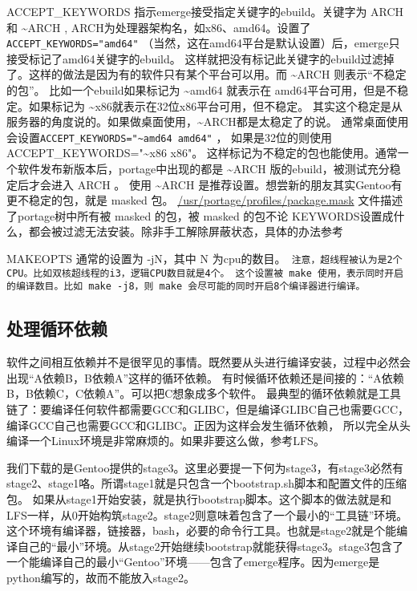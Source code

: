 \documentclass[amstex,twoside]{ctexbook}
\newenvironment{notice}{\tt}{}
\begin{document}
ACCEPT\_KEYWORDS%
指示emerge接受指定关键字的ebuild。关键字为 ARCH 和 \textasciitilde{}ARCH , ARCH为处理器架构名，如x86、amd64。设置了{\tt ACCEPT\_KEYWORDS="amd64"} （当然，这在amd64平台是默认设置）后，emerge只接受标记了amd64关键字的ebuild。
这样就把没有标记此关键字的ebuild过滤掉了。这样的做法是因为有的软件只有某个平台可以用。而 \textasciitilde{}ARCH 则表示“不稳定的包”。
比如一个ebuild如果标记为 \textasciitilde{}amd64 就表示在 amd64平台可用，但是不稳定。如果标记为 \textasciitilde{}x86就表示在32位x86平台可用，但不稳定。
其实这个稳定是从服务器的角度说的。如果做桌面使用，\textasciitilde{}ARCH都是太稳定了的说。
通常桌面使用会设置{\tt ACCEPT\_KEYWORDS="\textasciitilde{}amd64 amd64"} ， 如果是32位的则使用ACCEPT\_KEYWORDS="\textasciitilde{}x86 x86"。 这样标记为不稳定的包也能使用。通常一个软件发布新版本后，portage中出现的都是 \textasciitilde{}ARCH 版的ebuild，被测试充分稳定后才会进入 ARCH 。
使用 \textasciitilde{}ARCH 是推荐设置。想尝新的朋友其实Gentoo有更不稳定的包，就是 masked 包。
\url{/usr/portage/profiles/package.mask} 文件描述了portage树中所有被 masked 的包，被 masked 的包不论 KEYWORDS设置成什么，都会被过滤无法安装。除非手工解除屏蔽状态，具体的办法参考 %

MAKEOPTS%
通常的设置为 -jN，其中 N 为cpu的数目。\begin{notice}
注意，超线程被认为是2个CPU。比如双核超线程的i3，逻辑CPU数目就是4个。
\end{notice} 这个设置被 make 使用，表示同时开启的编译数目。比如 make -j8，则 make 会尽可能的同时开启8个编译器进行编译。


\subsection*{处理循环依赖}
软件之间相互依赖并不是很罕见的事情。既然要从头进行编译安装，过程中必然会出现“A依赖B，B依赖A”这样的循环依赖。
有时候循环依赖还是间接的：“A依赖B，B依赖C，C依赖A”。可以把C想象成多个软件。
最典型的循环依赖就是工具链了：要编译任何软件都需要GCC和GLIBC，但是编译GLIBC自己也需要GCC，编译GCC自己也需要GCC和GLIBC。正因为这样会发生循环依赖，
所以完全从头编译一个Linux环境是非常麻烦的。如果非要这么做，参考LFS。

我们下载的是Gentoo提供的stage3。这里必要提一下何为stage3，有stage3必然有stage2、stage1咯。所谓stage1就是只包含一个bootstrap.sh脚本和配置文件的压缩包。
如果从stage1开始安装，就是执行bootstrap脚本。这个脚本的做法就是和LFS一样，从0开始构筑stage2。stage2则意味着包含了一个最小的“工具链”环境。
这个环境有编译器，链接器，bash，必要的命令行工具。也就是stage2就是个能编译自己的“最小”环境。从stage2开始继续bootstrap就能获得stage3。stage3包含了一个能编译自己的最小“Gentoo”环境——包含了emerge程序。因为emerge是python编写的，故而不能放入stage2。
\end{document}
